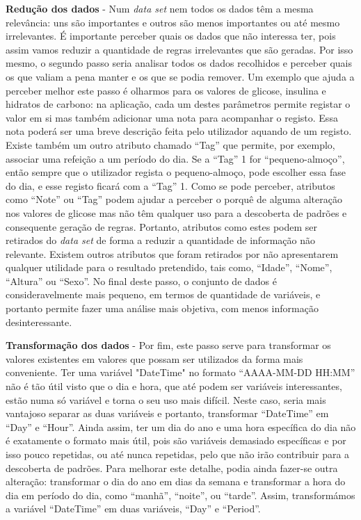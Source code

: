 \textbf{Redução dos dados} - Num \textit{data set} nem todos os dados têm a mesma relevância: uns são importantes e outros são menos importantes ou até mesmo irrelevantes. É importante perceber quais os dados que não interessa ter, pois assim vamos reduzir a quantidade de regras irrelevantes que são geradas. Por isso mesmo, o segundo passo seria analisar todos os dados recolhidos e perceber quais os que valiam a pena manter e os que se podia remover. Um exemplo que ajuda a perceber melhor este passo é olharmos para os valores de glicose, insulina e hidratos de carbono: na aplicação, cada um destes parâmetros permite registar o valor em si mas também adicionar uma nota para acompanhar o registo. Essa nota poderá ser uma breve descrição feita pelo utilizador aquando de um registo. Existe também um outro atributo chamado ``Tag'' que permite, por exemplo, associar uma refeição a um período do dia. Se a ``Tag'' 1 for ``pequeno-almoço'', então sempre que o utilizador regista o pequeno-almoço, pode escolher essa fase do dia, e esse registo ficará com a ``Tag'' 1. Como se pode perceber, atributos como ``Note'' ou ``Tag'' podem ajudar a perceber o porquê de alguma alteração nos valores de glicose mas não têm qualquer uso para a descoberta de padrões e consequente geração de regras. Portanto, atributos como estes podem ser retirados do \textit{data set} de forma a reduzir a quantidade de informação não relevante. Existem outros atributos que foram retirados por não apresentarem qualquer utilidade para o resultado pretendido, tais como, ``Idade'', ``Nome'', ``Altura'' ou ``Sexo''. 
No final deste passo, o conjunto de dados é consideravelmente mais pequeno, em termos de quantidade de variáveis, e portanto permite fazer uma análise mais objetiva, com menos informação desinteressante.

\textbf{Transformação dos dados} - Por fim, este passo serve para transformar os valores existentes em valores que possam ser utilizados da forma mais conveniente. Ter uma variável "DateTime" no formato ``AAAA-MM-DD HH:MM''  não é tão útil visto que o dia e hora, que até podem ser variáveis interessantes, estão numa só variável e torna o seu uso mais difícil. Neste caso, seria mais vantajoso separar as duas variáveis e portanto, transformar ``DateTime'' em ``Day'' e ``Hour''. Ainda assim, ter um dia do ano e uma hora específica do dia não é exatamente o formato mais útil, pois são variáveis demasiado específicas e por isso pouco repetidas, ou até nunca repetidas, pelo que não irão contribuir para a descoberta de padrões. Para melhorar este detalhe, podia ainda fazer-se outra alteração: transformar o dia do ano em dias da semana e transformar a hora do dia em período do dia, como ``manhã'', ``noite'', ou ``tarde''. Assim, transformámos a variável ``DateTime'' em duas variáveis, ``Day'' e ``Period''.


